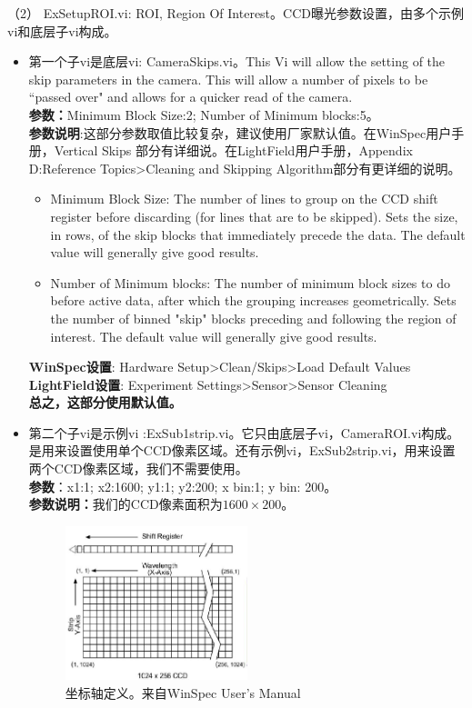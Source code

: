（2） ExSetupROI.vi: ROI, Region Of Interest。CCD曝光参数设置，由多个示例vi和底层子vi构成。
\begin{itemize}
\item 第一个子vi是底层vi: CameraSkips.vi。This Vi will allow the setting of the skip parameters in the camera. This will allow a number of pixels to be ``passed over" and  allows for a quicker read of the camera.
\\\textbf{参数：}Minimum Block Size:2; Number of Minimum blocks:5。
\\ \textbf{参数说明}:这部分参数取值比较复杂，建议使用厂家默认值。在WinSpec用户手册，Vertical Skips 部分有详细说。在LightField用户手册，Appendix D:Reference Topics>Cleaning and Skipping Algorithm部分有更详细的说明。
\begin{itemize}
\item Minimum Block Size: The number of lines to group on the CCD shift register before discarding (for lines that are to be skipped). Sets the size, in rows, of the skip blocks that immediately precede the data. The default value will generally give good results.
\item Number of Minimum blocks: The number of minimum block sizes to do before active data, after which the grouping increases geometrically. Sets the number of binned "skip"
blocks preceding and following the region of interest. The default value will generally give good results.
\end{itemize}
\textbf{WinSpec设置}: Hardware Setup>Clean/Skips>Load Default Values 
\\ \textbf{LightField设置}: Experiment Settings>Sensor>Sensor Cleaning
\\ \textbf{总之，这部分使用默认值。}

\item 第二个子vi是示例vi :ExSub1strip.vi。它只由底层子vi，CameraROI.vi构成。是用来设置使用单个CCD像素区域。还有示例vi，ExSub2strip.vi，用来设置两个CCD像素区域，我们不需要使用。
\\\textbf{参数}：x1:1; x2:1600; y1:1; y2:200; x bin:1; y bin: 200。
\\ \textbf{参数说明：}我们的CCD像素面积为$1600\times 200$。
\begin{figure}[h!]
\centering
\includegraphics[width=0.5\textwidth]{pictures/1.PNG}
\caption{坐标轴定义。来自WinSpec User's Manual}
\end{figure}


\end{itemize}
